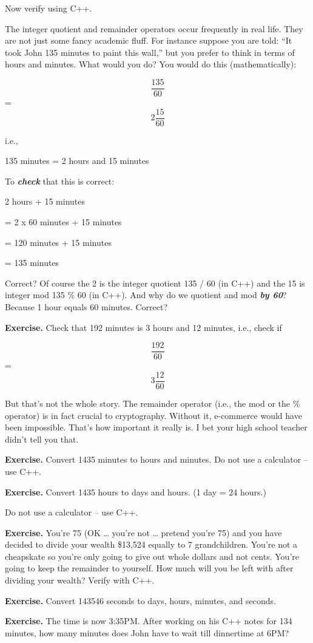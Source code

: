 \documentclass[
]{article}
\begin{document}
Now verify using C++.

The integer quotient and remainder operators occur frequently in real
life. They are not just some fancy academic fluff. For instance suppose
you are told: ``It took John 135 minutes to paint this wall,'' but you
prefer to think in terms of hours and minutes. What would you do? You
would do this (mathematically):

\[\frac{135}{60}\]= \[2\frac{15}{60}\]

i.e.,

135 minutes = 2 hours and 15 minutes

To \emph{\textbf{check}} that this is correct:

2 hours + 15 minutes

= 2 x 60 minutes + 15 minutes

= 120 minutes + 15 minutes

= 135 minutes

Correct? Of course the 2 is the integer quotient 135 / 60 (in C++) and
the 15 is integer mod 135 \% 60 (in C++). And why do we quotient and mod
\emph{\textbf{by 60}}? Because 1 hour equals 60 minutes. Correct?

\textbf{Exercise.} Check that 192 minutes is 3 hours and 12 minutes,
i.e., check if

\[\frac{192}{60}\]= \[3\frac{12}{60}\]

But that's not the whole story. The remainder operator (i.e., the mod or
the \% operator) is in fact crucial to cryptography. Without it,
e-commerce would have been impossible. That's how important it really
is. I bet your high school teacher didn't tell you that.

\textbf{Exercise.} Convert 1435 minutes to hours and minutes. Do not use
a calculator -- use C++.

\textbf{Exercise.} Convert 1435 hours to days and hours. (1 day = 24
hours.)

Do not use a calculator -- use C++.

\textbf{Exercise.} You're 75 (OK \ldots{} you're not \ldots{} pretend
you're 75) and you have decided to divide your wealth \$13,524 equally
to 7 grandchildren. You're not a cheapskate so you're only going to give
out whole dollars and not cents. You're going to keep the remainder to
yourself. How much will you be left with after dividing your wealth?
Verify with C++.

\textbf{Exercise.} Convert 143546 seconds to days, hours, minutes, and
seconds.

\textbf{Exercise.} The time is now 3:35PM. After working on his C++
notes for 134 minutes, how many minutes does John have to wait till
dinnertime at 6PM?
\end{document}
